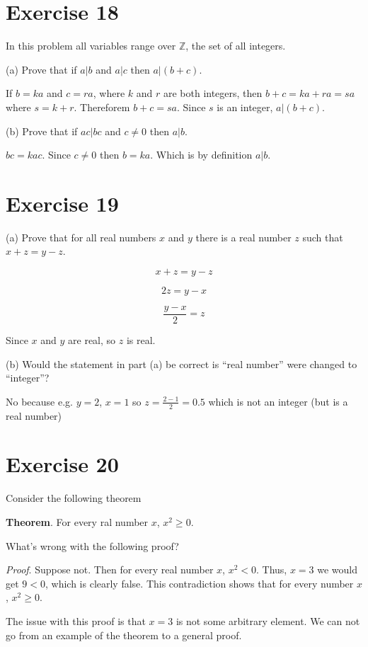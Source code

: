 \documentclass[11pt]{article}
\begin{document}
\section*{Exercise 18}

In this problem all variables range over $\mathbb{Z}$, the set of all integers.

\noindent (a) Prove that if $a | b$ and $a | c$ then $a | (b + c)$.

If $b = ka$ and $c = ra$, where $k$ and $r$ are both integers, then 
$b + c = ka + ra = sa$ where $s = k + r$. Thereforem $b + c = sa$. Since 
$s$ is an integer, $a | (b + c)$.

\noindent (b) Prove that if $ac | bc$ and $c \neq 0$ then $a | b$.

$bc = kac$. Since $c \neq 0$ then $b = ka$. Which is by definition $a | b$.

\section*{Exercise 19}

\noindent (a) Prove that for all real numbers $x$ and $y$ there is a real number 
$z$ such that $x + z = y - z$.

$$x + z = y - z$$

$$2z = y - x$$

$$\frac{y - x}{2} = z$$

Since $x$ and $y$ are real, so $z$ is real.

\noindent (b) Would the statement in part (a) be correct is ``real number'' were 
changed to ``integer''?

No because e.g. $y = 2$, $x = 1$ so $z = \frac{2 - 1}{2} = 0.5$ which is not an
integer (but is a real number)

\section*{Exercise 20}

Consider the following theorem 

\textbf{Theorem}. For every ral number $x$, $x^2 \geq 0$.

What's wrong with the following proof?

\textit{Proof}. Suppose not. Then for every real number $x$, $x^2 < 0$. 
Thus, $x = 3$ we would get $9 < 0$, which is clearly false. This contradiction 
shows that for every number $x$, $x^2 \geq 0$.

The issue with this proof is that $x = 3$ is not some arbitrary element. We can 
not go from an example of the theorem to a general proof.
\end{document}
